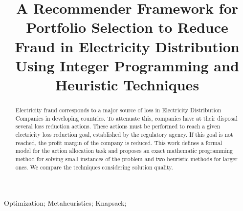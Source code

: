 \documentclass[10pt, conference, compsocconf]{IEEEtran}
\renewcommand*{\nameyeardelim}{\addspace}
\renewcommand*{\revsdnamedelim}{\addspace}
\begin{document}
\renewcommand*{\nameyeardelim}{\addspace}
\renewcommand*{\revsdnamedelim}{\addspace}
%
\title{A Recommender Framework for Portfolio Selection to Reduce
Fraud in Electricity Distribution Using Integer Programming and Heuristic Techniques}




\author{
}



\maketitle


\begin{abstract}
Electricity fraud corresponds to a major source of loss in Electricity
Distribution Companies in developing countries. To attenuate this,
companies have at their disposal several loss reduction actions. These actions
must be performed to reach a given electricity loss reduction goal, established
by the regulatory agency. If this goal is not reached, the profit margin
of the company is reduced.
This work defines a formal model for the action allocation task 
and proposes an exact mathematic programming method for solving small instances of
the problem and two heuristic methods for larger ones. We compare
the techniques considering solution quality.

\end{abstract}

\begin{IEEEkeywords}
Optimization; Metaheuristics; Knapsack;
\end{IEEEkeywords}


%
\IEEEpeerreviewmaketitle














\printbibliography

\end{document}

